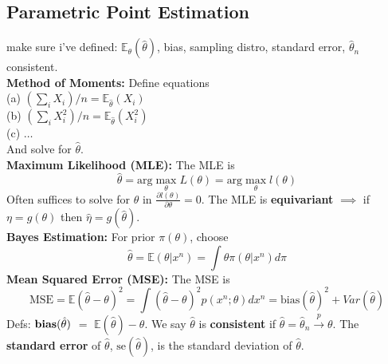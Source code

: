 \documentclass[10pt,twocolumn]{article}
\begin{document}
\subsection*{Parametric Point Estimation}
make sure i've defined: $\mathbb{E}_{\theta}(\hat{\theta})$, bias, sampling distro, standard error, $\hat{\theta}_{n}$ consistent.\\
\textbf{Method of Moments:} Define equations\\
(a) \hspace{3mm} $(\sum_{i} X_{i})/n = \mathbb{E}_{\hat{\theta}}(X_{i})$\\
(b) \hspace{3mm} $(\sum_{i} X_{i}^{2})/n = \mathbb{E}_{\hat{\theta}}(X_{i}^{2})$\\
(c) \hspace{3mm} $\ldots$ \\
And solve for $\hat{\theta}$.\\
\textbf{Maximum Likelihood (MLE):} The MLE is
\begin{equation}
\hat{\theta} = \text{arg}\max_{\theta} L(\theta) = \text{arg}\max_{\theta} l(\theta)
\end{equation}
Often suffices to solve for $\theta$ in $\frac{\partial l(\theta)}{\partial \theta} = 0$.
The MLE is \textbf{equivariant} $\implies$ if $\eta = g(\theta)$ then $\hat{\eta} = g(\hat{\theta})$. \\
\textbf{Bayes Estimation:} For prior $\pi(\theta)$, choose 
\begin{equation}
    \hat{\theta} = \mathbb{E}(\theta|x^{n}) = \int \theta \pi(\theta|x^{n}) d\pi
\end{equation}
\textbf{Mean Squared Error (MSE):} The MSE is
\begin{equation}
    \text{MSE} = \mathbb{E}(\hat{\theta} - \theta)^{2} = \int (\hat{\theta}-\theta)^{2} p(x^{n};\theta)dx^{n} = \text{bias}({\hat{\theta}})^{2} + Var(\hat{\theta})
\end{equation}
Defs: $\text{\textbf{bias}}(\hat{\theta})$ $=$ $\mathbb{E}(\hat{\theta}) - \theta$. We say $\hat{\theta}$ is \textbf{consistent} if $\hat{\theta} = \hat{\theta}_{n} \xrightarrow{p} \theta$. The \textbf{standard error} of $\hat{\theta}$, $\text{se}(\hat{\theta})$, is the standard deviation of $\hat{\theta}$.\\
\end{document}

